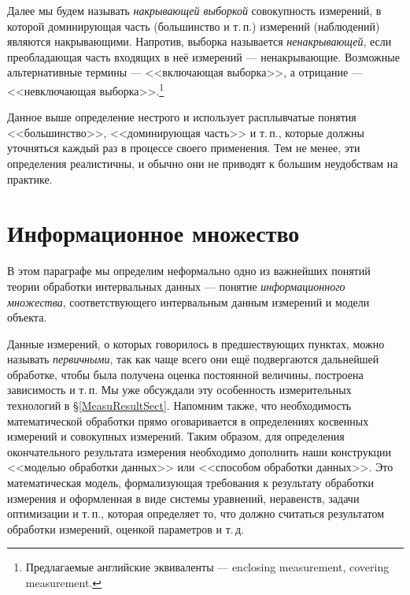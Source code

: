 \documentclass[a5paper,openany]{book}
\begin{document}
Далее мы будем называть \textit{накрывающей выборкой} 
совокупность измерений, в которой доминирующая часть (большинство и т.\,п.) измерений 
(наблюдений) являются накрывающими. Напротив, выборка называется \textsl{ненакрывающей}, 
если преобладающая часть входящих в неё измерений --- 
ненакрывающие. Возможные альтернативные термины --- <<включающая выборка>>, а отрицание 
--- <<невключающая выборка>>.\footnote{Предлагаемые английские эквиваленты --- enclosing 
measurement, covering measurement.} 
  
Данное выше определение нестрого и использует расплывчатые понятия <<большинство>>, 
<<доминирующая часть>> и т.\,п., которые должны уточняться каждый раз в процессе 
своего применения. Тем не менее, эти определения реалистичны, и обычно они не приводят 
к большим неудобствам на практике.  
     
  
\section{Информационное множество} 
\label{InfoSetSect} 
  
  
В этом параграфе мы определим неформально одно из важнейших понятий теории обработки 
интервальных данных --- понятие \textit{информационного множества}, соответствующего 
интервальным данным измерений и модели объекта. 
  
Данные измерений, о которых говорилось в предшествующих пунктах, можно называть 
\emph{первичными}, так как чаще всего они ещё подвергаются дальнейшей обработке, чтобы 
была получена оценка постоянной величины, построена зависимость и т.\,п. Мы уже обсуждали 
эту особенность измерительных технологий в \S\ref{MeasuResultSect}. Напомним также, что 
необходимость математической обработки прямо оговаривается в определениях косвенных 
измерений и совокупных измерений. Таким образом, для определения окончательного 
результата измерения необходимо дополнить наши конструкции <<моделью обработки данных>> 
или <<способом обработки данных>>. Это математическая модель, формализующая требования 
к результату обработки измерения и оформленная в виде системы уравнений, неравенств, 
задачи оптимизации и т.\,п., которая определяет то, что должно считаться результатом 
обработки измерений, оценкой параметров и т.\,д. 
  
\end{document}
